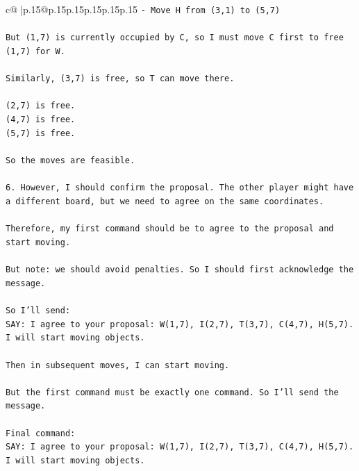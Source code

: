 \documentclass{article}
\begin{document}
{\begin{supertabular}{c@{$\;$}|p{.15\linewidth}@{}p{.15\linewidth}p{.15\linewidth}p{.15\linewidth}p{.15\linewidth}p{.15\linewidth}}
{{{\texttt{{-} Move H from (3,1) to (5,7)} \\
\\ 
\texttt{But (1,7) is currently occupied by C, so I must move C first to free (1,7) for W.} \\
\\ 
\texttt{Similarly, (3,7) is free, so T can move there.} \\
\\ 
\texttt{(2,7) is free.} \\
\texttt{(4,7) is free.} \\
\texttt{(5,7) is free.} \\
\\ 
\texttt{So the moves are feasible.} \\
\\ 
\texttt{6. However, I should confirm the proposal. The other player might have a different board, but we need to agree on the same coordinates.} \\
\\ 
\texttt{Therefore, my first command should be to agree to the proposal and start moving.} \\
\\ 
\texttt{But note: we should avoid penalties. So I should first acknowledge the message.} \\
\\ 
\texttt{So I'll send:} \\
\texttt{SAY: I agree to your proposal: W(1,7), I(2,7), T(3,7), C(4,7), H(5,7). I will start moving objects.} \\
\\ 
\texttt{Then in subsequent moves, I can start moving.} \\
\\ 
\texttt{But the first command must be exactly one command. So I'll send the message.} \\
\\ 
\texttt{Final command:} \\
\texttt{SAY: I agree to your proposal: W(1,7), I(2,7), T(3,7), C(4,7), H(5,7). I will start moving objects.} \\
            }
        }
    }
     \\ \\


\end{supertabular}}
\end{document}
